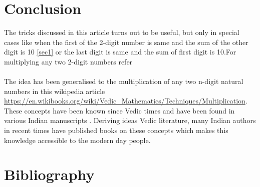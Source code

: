 \documentclass[12pt, a4paper]{article}
\begin{document}
\section{Conclusion}
	The tricks discussed in this article turns out to be useful, but only in special cases like when the first of the 2-digit number is same and the sum of the other digit is 10 \ref{sec1} or the last digit is same and the sum of first digit is 10.For multiplying any two 2-digit numbers refer\cite{youtube} \\\\
	The idea has been generalised to the multiplication of any two n-digit natural numbers in this wikipedia article \url{https://en.wikibooks.org/wiki/Vedic_Mathematics/Techniques/Multiplication}. These concepts have been known since Vedic times and have been found in various Indian manuscripts \cite{Book2}. Deriving ideas Vedic literature, many Indian authors in recent times have published books on these concepts \cite{Book1} which makes this knowledge accessible to the modern day people. 
\section{Bibliography}


\end{document}
